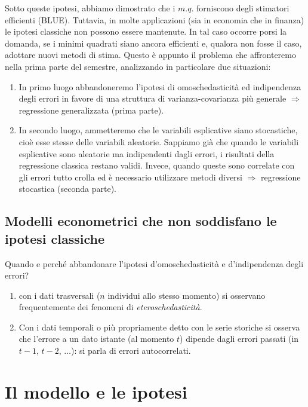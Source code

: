\documentclass[a4paper]{report}
\theoremstyle{remark}
\begin{document}
\noindent Sotto queste ipotesi, abbiamo dimostrato che i $m.q.$ forniscono
degli stimatori efficienti (BLUE). Tuttavia, in molte applicazioni (sia in
economia che in finanza) le ipotesi classiche non possono essere mantenute.
In tal caso occorre porsi la domanda, se i minimi quadrati siano ancora
efficienti e, qualora non fosse il caso, adottare nuovi metodi di stima.
Questo \`{e} appunto il problema che affronteremo nella prima parte del
semestre, analizzando in particolare due situazioni:

\begin{enumerate}
\item In primo luogo abbandoneremo l'ipotesi di omoschedasticit\`{a} ed
indipendenza degli errori in favore di una struttura di varianza-covarianza
pi\`{u} generale $\Rightarrow $ regressione generalizzata (prima parte).

\item In secondo luogo, ammetteremo che le variabili esplicative siano
stocastiche, cio\`{e} esse stesse delle variabili aleatorie. Sappiamo gi\`{a}
che quando le variabili esplicative sono aleatorie ma indipendenti dagli
errori, i risultati della regressione classica restano validi. Invece,
quando queste sono correlate con gli errori tutto crolla ed \`{e} necessario
utilizzare metodi diversi $\Rightarrow $ regressione stocastica (seconda
parte).
\end{enumerate}

\subsection{Modelli econometrici che non soddisfano le ipotesi classiche}

Quando e perch\'{e} abbandonare l'ipotesi d'omoschedasticit\`{a} e
d'indipendenza degli errori?

\begin{enumerate}
\item con i dati trasversali ($n$ individui allo stesso momento) si
osservano frequentemente dei fenomeni di \emph{eteroschedasticit\`{a}}.

\item Con i dati temporali o pi\`{u} propriamente detto con le serie
storiche si osserva che l'errore a un dato istante (al momento $t$) dipende
dagli errori passati (in $t-1$, $t-2$, $\dots $): si parla di errori
autocorrelati.
\end{enumerate}

\section{Il modello e le ipotesi}
\end{document}
